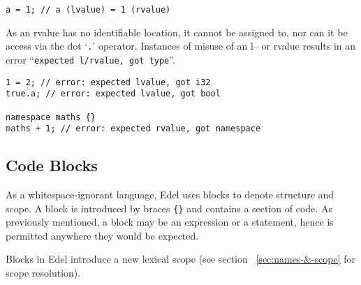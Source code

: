 \begin{lstlisting}[language=CustomLang]
a = 1; // a (lvalue) = 1 (rvalue)
\end{lstlisting}

As an rvalue has no identifiable location, it cannot be assigned to, nor can it be access via the dot `\texttt{.}' operator.
Instances of misuse of an l-- or rvalue results in an error ``\texttt{expected l/rvalue, got type}''.

\begin{lstlisting}[language=CustomLang]
1 = 2; // error: expected lvalue, got i32
true.a; // error: expected lvalue, got bool

namespace maths {}
maths + 1; // error: expected rvalue, got namespace
\end{lstlisting}

\subsection{Code Blocks}\label{subsec:code-blocks}

As a whitespace-ignorant language, Edel uses blocks to denote structure and scope.
A block is introduced by braces \texttt{\{\}} and contains a section of code.
As previously mentioned, a block may be an expression or a statement, hence is permitted anywhere they would be expected.

Blocks in Edel introduce a new lexical scope (see section ~\ref{sec:names-&-scope} for scope resolution).
